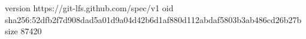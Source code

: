 version https://git-lfs.github.com/spec/v1
oid sha256:52dfb2f7d908dad5a01d9a04d42b6d1af880d112abdaf5803b3ab486cd26b27b
size 87420

